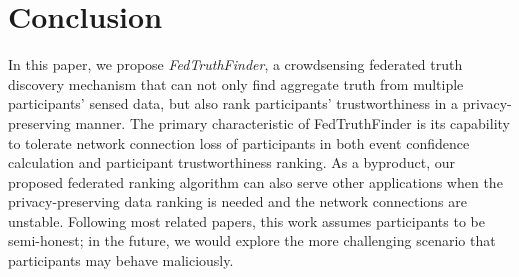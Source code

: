 %
%

\section{Conclusion}

In this paper, we propose \textit{FedTruthFinder}, a crowdsensing federated truth discovery mechanism that can not only find aggregate truth from multiple participants' sensed data, but also rank participants' trustworthiness in a privacy-preserving manner. The primary characteristic of FedTruthFinder is its capability to tolerate network connection loss of participants in both event confidence calculation and participant trustworthiness ranking. As a byproduct, our proposed federated ranking algorithm can also serve other applications when the privacy-preserving data ranking is needed and the network connections are unstable.
Following most related papers, this work assumes participants to be semi-honest; in the future, we would explore the more challenging scenario that participants may behave maliciously.%

